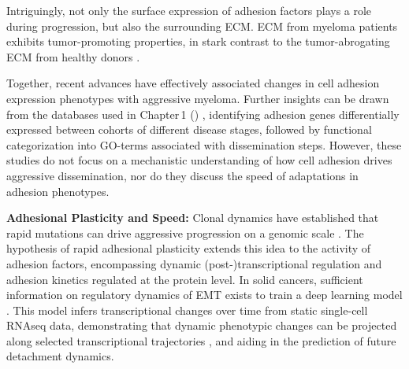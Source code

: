 Intriguingly, not only the surface expression of adhesion factors plays a role
during progression, but also the surrounding \ac{ECM}. \ac{ECM} from myeloma
patients exhibits tumor-promoting properties, in stark contrast to the
tumor-abrogating \ac{ECM} from healthy donors
\cite{ibraheemBMMSCsderivedECMModifies2019}.

Together, recent advances have effectively associated changes in cell adhesion
expression phenotypes with aggressive myeloma. Further insights can be drawn
from the databases used in Chapter\,1 ()
\cite{seckingerCD38ImmunotherapeuticTarget2018}, identifying adhesion genes
differentially expressed between cohorts of different disease stages, followed by
functional categorization into GO-terms associated with dissemination steps.
However, these studies do not focus on a mechanistic understanding of how cell
adhesion drives aggressive dissemination, nor do they discuss the speed of
adaptations in adhesion phenotypes.


\textbf{Adhesional Plasticity and Speed:}
Clonal dynamics have established that rapid mutations can drive aggressive
progression on a genomic scale \cite{keatsClonalCompetitionAlternating2012,
      eversPrognosticValueExtracellular2023}. The hypothesis of rapid adhesional
plasticity extends this idea to the activity of adhesion factors, encompassing
dynamic (post-)transcriptional regulation and adhesion kinetics regulated at the
protein level. In solid cancers, sufficient information on regulatory dynamics
of \ac{EMT} exists to train a deep learning model
\cite{tongLearningTranscriptionalRegulatory2023}. This model infers
transcriptional changes over time from static single-cell RNAseq data,
demonstrating that dynamic phenotypic changes can be projected along selected
transcriptional trajectories , and aiding in the
prediction of future detachment dynamics.


